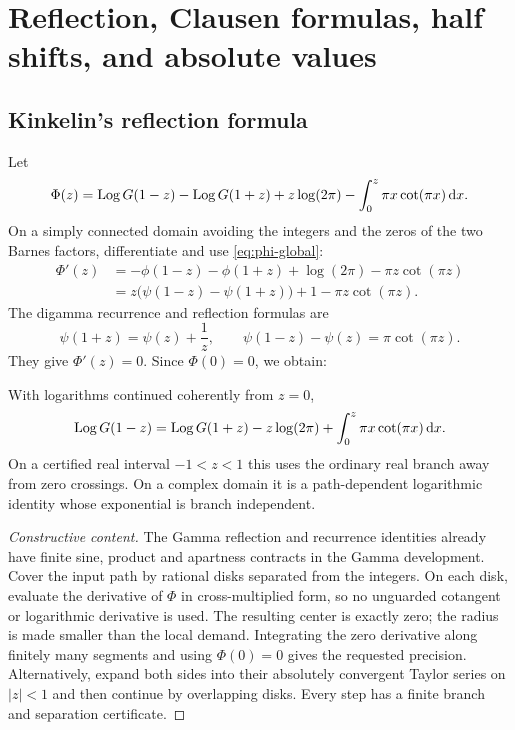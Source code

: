 \section{Reflection, Clausen formulas, half shifts, and absolute values}\label{sec:reflection}

\subsection{Kinkelin's reflection formula}

Let
\[
 \Phi(z)=\operatorname{Log} G(1-z)-\operatorname{Log} G(1+z)+z\log(2\pi)
          -\int_0^z\pi x\cot(\pi x)\,\mathrm d x.
\]
On a simply connected domain avoiding the integers and the zeros of the two
Barnes factors, differentiate and use \cref{eq:phi-global}:
\begin{align*}
 \Phi'(z)
 &=-\phi(1-z)-\phi(1+z)+\log(2\pi)-\pi z\cot(\pi z)\\
 &=z\bigl(\psi(1-z)-\psi(1+z)\bigr)+1-\pi z\cot(\pi z).
\end{align*}
The digamma recurrence and reflection formulas are
\[
 \psi(1+z)=\psi(z)+\frac1z,
 \qquad
 \psi(1-z)-\psi(z)=\pi\cot(\pi z).
\]
They give \(\Phi'(z)=0\).  Since \(\Phi(0)=0\), we obtain:

\begin{theorem}\label{thm:kinkelin}
With logarithms continued coherently from \(z=0\),
\begin{equation}\label{eq:kinkelin}
 \operatorname{Log} G(1-z)
 =\operatorname{Log} G(1+z)-z\log(2\pi)
  +\int_0^z\pi x\cot(\pi x)\,\mathrm d x.
\end{equation}
On a certified real interval \(-1<z<1\) this uses the ordinary real branch
away from zero crossings.  On a complex domain it is a path-dependent
logarithmic identity whose exponential is branch independent.
\end{theorem}

\begin{proof}[Constructive content]
The Gamma reflection and recurrence identities already have finite sine,
product and apartness contracts in the Gamma development.  Cover the input path
by rational disks separated from the integers.  On each disk, evaluate the
derivative of \(\Phi\) in cross-multiplied form, so no unguarded cotangent or
logarithmic derivative is used.  The resulting center is exactly zero; the
radius is made smaller than the local demand.  Integrating the zero derivative
along finitely many segments and using \(\Phi(0)=0\) gives the requested
precision.  Alternatively, expand both sides into their absolutely convergent
Taylor series on \(|z|<1\) and then continue by overlapping disks.  Every step
has a finite branch and separation certificate.
\end{proof}

